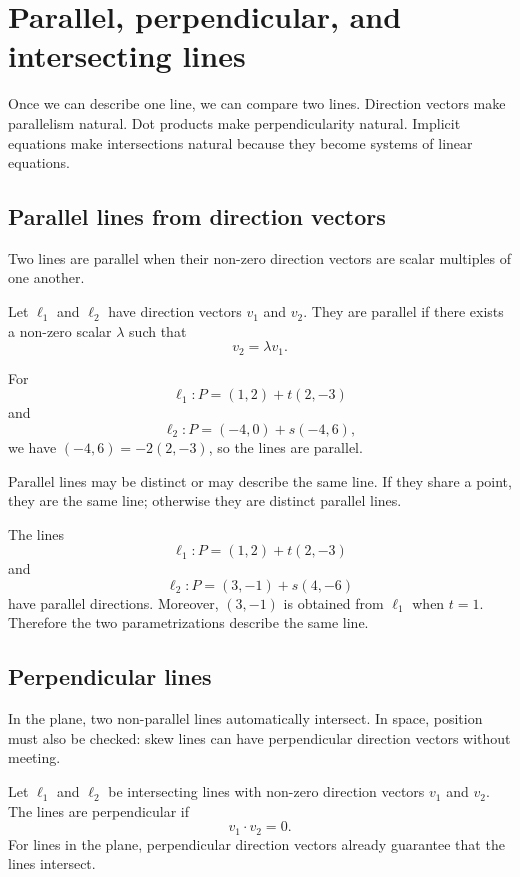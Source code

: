 \section{Parallel, perpendicular, and intersecting lines}

Once we can describe one line, we can compare two lines. Direction vectors make parallelism natural. Dot products make perpendicularity natural. Implicit equations make intersections natural because they become systems of linear equations.

\subsection*{Parallel lines from direction vectors}

Two lines are parallel when their non-zero direction vectors are scalar multiples of one another.

\begin{definitionbox}
Let \(\ell_1\) and \(\ell_2\) have direction vectors \(v_1\) and \(v_2\). They are parallel if there exists a non-zero scalar \(\lambda\) such that
\[
v_2=\lambda v_1.
\]
\end{definitionbox}

\begin{examplebox}
For
\[
\ell_1:P=(1,2)+t(2,-3)
\]
and
\[
\ell_2:P=(-4,0)+s(-4,6),
\]
we have \((-4,6)=-2(2,-3)\), so the lines are parallel.
\end{examplebox}

Parallel lines may be distinct or may describe the same line. If they share a point, they are the same line; otherwise they are distinct parallel lines.

\begin{examplebox}
The lines
\[
\ell_1:P=(1,2)+t(2,-3)
\]
and
\[
\ell_2:P=(3,-1)+s(4,-6)
\]
have parallel directions. Moreover, \((3,-1)\) is obtained from \(\ell_1\) when \(t=1\). Therefore the two parametrizations describe the same line.
\end{examplebox}

\subsection*{Perpendicular lines}

In the plane, two non-parallel lines automatically intersect. In space, position must also be checked: skew lines can have perpendicular direction vectors without meeting.

\begin{definitionbox}
Let \(\ell_1\) and \(\ell_2\) be intersecting lines with non-zero direction vectors \(v_1\) and \(v_2\). The lines are perpendicular if
\[
v_1\cdot v_2=0.
\]
For lines in the plane, perpendicular direction vectors already guarantee that the lines intersect.
\end{definitionbox}

